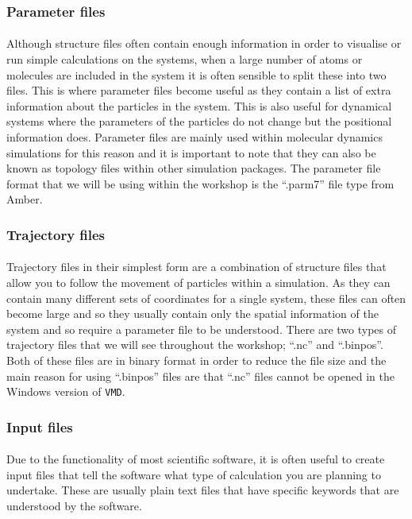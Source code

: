     \subsubsection{Parameter files}
    \paragraph{}
        Although structure files often contain enough information in order to visualise or run simple calculations on the systems, when a large number of atoms or molecules are included in the system it is often sensible to split these into two files. This is where parameter files become useful as they contain a list of extra information about the particles in the system. This is also useful for dynamical systems where the parameters of the particles do not change but the positional information does. Parameter files are mainly used within molecular dynamics simulations for this reason and it is important to note that they can also be known as topology files within other simulation packages. The parameter file format that we will be using within the workshop is the \enquote{.parm7} file type from Amber.

    \subsubsection{Trajectory files}
    \paragraph{}
        Trajectory files in their simplest form are a combination of structure files that allow you to follow the movement of particles within a simulation. As they can contain many different sets of coordinates for a single system, these files can often become large and so they usually contain only the spatial information of the system and so require a parameter file to be understood. There are two types of trajectory files that we will see throughout the workshop; \enquote{.nc} and \enquote{.binpos}. Both of these files are in binary format in order to reduce the file size and the main reason for using \enquote{.binpos} files are that \enquote{.nc} files cannot be opened in the Windows version of \texttt{VMD}.

    \subsubsection{Input files}
    \paragraph{}
        Due to the functionality of most scientific software, it is often useful to create input files that tell the software what type of calculation you are planning to undertake. These are usually plain text files that have specific keywords that are understood by the software. 

